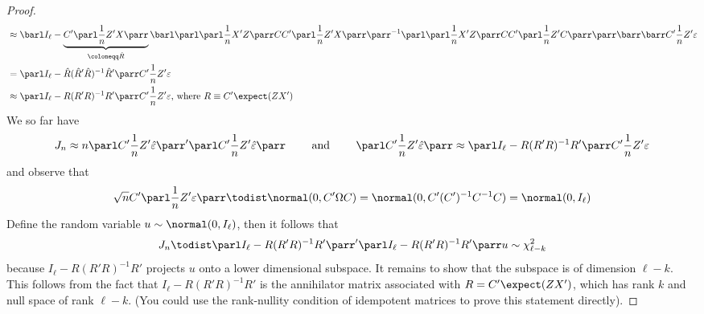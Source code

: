 \documentclass[10pt]{article}
\begin{document}
\begin{proof}
\begin{align*}
		&\approx \barl I_\ell - \underbrace{C'\parl \frac{1}{n} Z'X\parr}_{\coloneqq\hat{R}} \barl \parl \parl \frac{1}{n}X'Z\parr CC' \parl \frac{1}{n}Z'X\parr\parr^{-1}\parl \parl \frac{1}{n}X'Z\parr CC' \parl \frac{1}{n}Z'C\parr\parr  \barr\barr C' \frac{1}{n} Z'\varepsilon \\
		&= \parl I_\ell - \hat{R}(\hat{R}'\hat{R})^{-1}\hat{R}' \parr C' \frac{1}{n} Z'\varepsilon \\
		&\approx \parl I_\ell - R(R'R)^{-1}R'\parr C' \frac{1}{n} Z'\varepsilon\text{, where } R \equiv C' \expect(ZX')
	\end{align*}
	We so far have 
	\[J_n \approx n \parl C' \frac{1}{n} Z'\hat{\varepsilon}\parr'\parl C' \frac{1}{n} Z'\hat{\varepsilon}\parr \qquad \text{ and } \qquad \parl C' \frac{1}{n} Z'\hat{\varepsilon}\parr \approx \parl I_\ell - R(R'R)^{-1}R'\parr C' \frac{1}{n} Z'\varepsilon\]and observe that \[\sqrt{n}C'\parl \frac{1}{n}Z'\varepsilon\parr \todist \normal(0,C'\Omega C) = \normal(0,C'(C')^{-1}C^{-1}C) = \normal(0,I_\ell)\]
	Define the random variable $u \sim \normal(0,I_\ell)$, then it follows that\[J_n \todist \parl I_\ell - R(R'R)^{-1}R'\parr' \parl I_\ell - R(R'R)^{-1}R'\parr u \sim \chi^2_{\ell - k}\]because $ I_\ell - R(R'R)^{-1}R'$ projects $u$ onto a lower dimensional subspace. It remains to show that the subspace is of dimension $\ell - k$. This follows from the fact that $I_\ell - R(R'R)^{-1}R'$ is the annihilator matrix associated with $R = C'\expect(ZX')$, which has rank $k$ and null space of rank $\ell - k$. (You could use the rank-nullity condition of idempotent matrices to prove this statement directly).
\end{proof}
\end{document}

